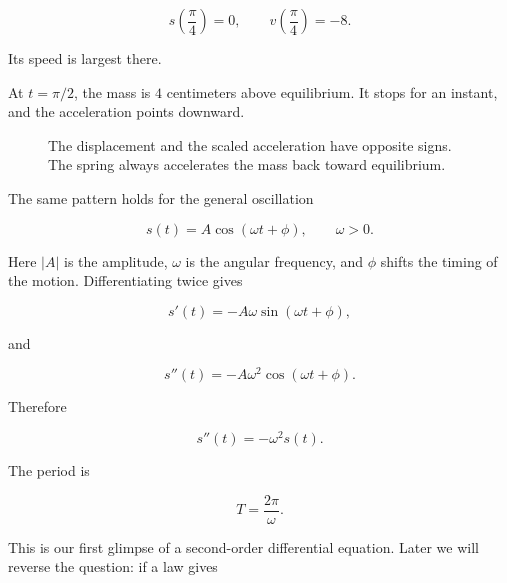 \[
s\left(\frac{\pi}{4}\right)=0,
\qquad
v\left(\frac{\pi}{4}\right)=-8.
\]

Its speed is largest there.

At \(t=\pi/2\), the mass is \(4\) centimeters above equilibrium. It stops for an
instant, and the acceleration points downward.

\begin{figure}[h]
\centering
{}
\caption{The displacement and the scaled acceleration have opposite signs. The spring always accelerates the mass back toward equilibrium.}
\label{fig:shm-displacement-acceleration}
\end{figure}

The same pattern holds for the general oscillation

\[
s(t)=A\cos(\omega t+\phi),
\qquad
\omega>0.
\]

Here \(|A|\) is the amplitude, \(\omega\) is the angular frequency, and \(\phi\)
shifts the timing of the motion. Differentiating twice gives

\[
s'(t)=-A\omega\sin(\omega t+\phi),
\]

and

\[
s''(t)=-A\omega^2\cos(\omega t+\phi).
\]

Therefore

\[
\boxed{
s''(t)=-\omega^2s(t).
}
\]

The period is

\[
\boxed{
T=\frac{2\pi}{\omega}.
}
\]

This is our first glimpse of a second-order differential equation. Later we will
reverse the question: if a law gives

